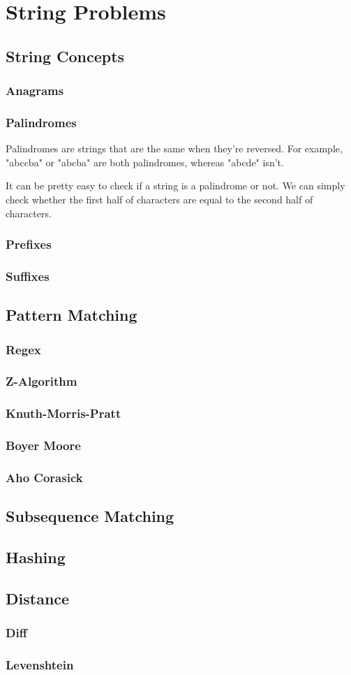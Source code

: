 \section{String Problems}
\subsection{String Concepts}
\subsubsection{Anagrams}
\subsubsection{Palindromes}

Palindromes are strings that are the same when they're reversed. For example, "abccba" or "abcba" are both palindromes, whereas "abcde" isn't.

It can be pretty easy to check if a string is a palindrome or not. We can simply check whether the first half of characters are equal to the second half of characters.


\subsubsection{Prefixes}
\subsubsection{Suffixes}
\subsection{Pattern Matching}
\subsubsection{Regex}
\subsubsection{Z-Algorithm}
\subsubsection{Knuth-Morris-Pratt}
\subsubsection{Boyer Moore}
\subsubsection{Aho Corasick}
\subsection{Subsequence Matching}
\subsection{Hashing}
\subsection{Distance}
\subsubsection{Diff}
\subsubsection{Levenshtein}